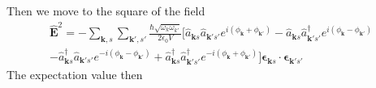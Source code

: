 \documentclass[../../../main.tex]{subfiles}
\begin{document}
Then we move to the square of the field
\begin{multline*}
  \hat{\mathbf{E}}^2
  =  - \sum_{\mathbf{k},s} \sum_{\mathbf{k}',s'} \frac{\hbar \sqrt{\omega_k \omega_{k'}}}{2 \epsilon_0 V}
  \bigg[ \hat{a}_{\mathbf{k }s} \hat{a}_{\mathbf{k }'s'}  e ^{i(\phi_{\mathbf{k }} +\phi_{\mathbf{k }'})}
    -\hat{a}_{\mathbf{k }s} \hat{a}^\dagger_{\mathbf{k }'s'} e ^{i(\phi_{\mathbf{k }}-\phi_{\mathbf{k }'})} \\
    -\hat{a}_{\mathbf{k }s} ^\dagger\hat{a}_{\mathbf{k }'s'} e ^{-i(\phi_{\mathbf{k }}-\phi_{\mathbf{k }'})}
    +\hat{a}^\dagger_{\mathbf{k }s} \hat{a}^\dagger_{\mathbf{k }'s'} e ^{-i(\phi_{\mathbf{k }}+\phi_{\mathbf{k }'})} \bigg]
  \boldsymbol{\epsilon}_{\mathbf{k}s} \cdot \boldsymbol{\epsilon}_{\mathbf{k}'s'}
\end{multline*}
The expectation value then
\end{document}
